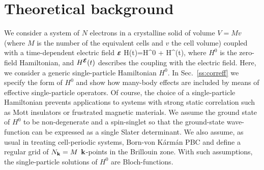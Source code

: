 


\section{Theoretical background}\label{sc:theory}
We consider a system of $N$ electrons in a crystalline solid of volume $V=Mv$ (where $M$ is the number of the equivalent cells and $v$ the cell volume) coupled with a time-dependent electric field $\boldsymbol{\scriptstyle \cal E}$
\be
H(t)=H^0 + H^{\efield}(t), \label{eq:startH}
\ee
where $H^0$ is the zero-field Hamiltonian, and $H^{\boldsymbol{\scriptstyle \cal E}}(t)$ describes the coupling with the electric field. %
Here, we consider a generic single-particle Hamiltonian $H^0$. In Sec.~\ref{ss:correff} we specify the form of $H^0$ and show how many-body effects are included by means of effective single-particle operators. Of course, the choice of a single-particle Hamiltonian prevents applications to systems with strong static correlation such as Mott insulators or frustrated magnetic materials.
We assume the ground state of $H^0$ to be non-degenerate and a spin-singlet so that the ground-state wave-function can be expressed as a single Slater determinant. 
We also assume, as usual in treating cell-periodic systems, Born-von K\'arm\'an PBC and define a regular grid of  $N_{\bf k}=M$  ${\bf k}$-points in the Brillouin zone. With such assumptions, the single-particle solutions of $H^0$ are Bloch-functions.

